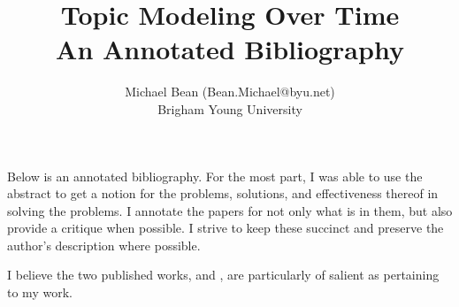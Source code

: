 \documentclass [11pt]{article}
\begin{document}
\title{Topic Modeling Over Time\\\medskip An Annotated Bibliography}
\author{Michael Bean (Bean.Michael@byu.net)\\Brigham Young University}
\maketitle

Below is an annotated bibliography. For the most part, I was able to use the abstract to get a notion for the problems, solutions, and effectiveness thereof in solving the problems. I annotate the papers for not only what is in them, but also provide a critique when possible. I strive to keep these succinct and preserve the author's description where possible.

I believe the two published works, \cite{hall-jurafsky-manning:2008:EMNLP} and \cite{Krstovski2013efficient}, are particularly of salient as pertaining to my work.

\nocite{*}

\end{document}
